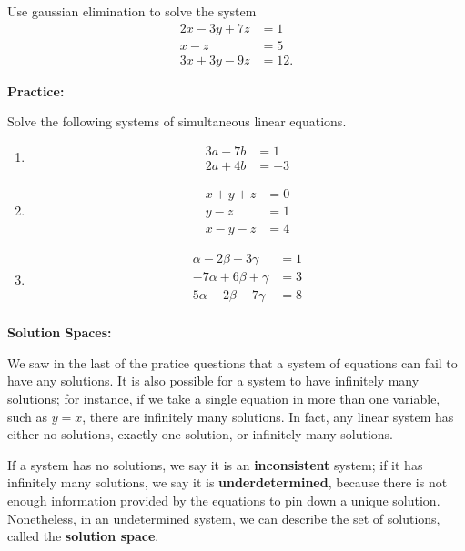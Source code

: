 \documentclass{article}
\begin{document}
Use gaussian elimination to solve the system
\begin{align*}
	2x-3y+7z&=1\\
	x-z&=5\\
	3x+3y-9z&=12.
\end{align*}


\clearpage



\textbf{Practice:}\bigskip

Solve the following systems of simultaneous linear equations.

\begin{enumerate}
	\item \begin{align*}
			3a-7b&=1\\
			2a+4b&=-3
		\end{align*}
	\item \begin{align*}
			x+y+z&=0\\
			y-z&=1\\
			x-y-z&=4
		\end{align*}
	\item \begin{align*}
			\alpha-2\beta+3\gamma &=1\\
			-7\alpha+6\beta + \gamma &=3\\
			5\alpha-2\beta -7\gamma &=8\\
		\end{align*}
\end{enumerate}

\clearpage



\textbf{Solution Spaces:}\bigskip


We saw in the last of the pratice questions that a system of equations can fail to have any solutions. It is also possible for a system to have infinitely many solutions; for instance, if we take a single equation in more than one variable, such as $y=x$, there are infinitely many solutions. In fact, any linear system has either no solutions, exactly one solution, or infinitely many solutions.

If a system has no solutions, we say it is an \textbf{inconsistent} system; if it has infinitely many solutions, we say it is \textbf{underdetermined}, because there is not enough information provided by the equations to pin down a unique solution. Nonetheless, in an undetermined system, we can describe the set of solutions, called the \textbf{solution space}.\medskip
\end{document}
